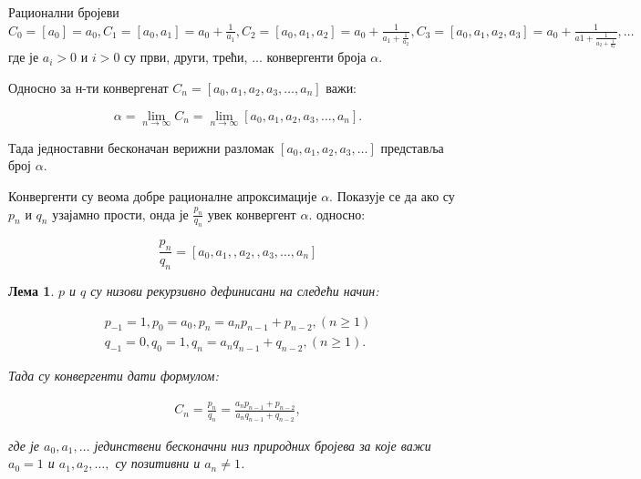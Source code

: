 \documentclass[a4paper]{article}
\newtheorem{lemma}{Лема}
\begin{document}
Рационални бројеви $ C_{0} = [a_{0}] = a_{0}, C_{1} = [a_{0}, a_{1}] = a_{0} + \frac{1}{a_{1}}, C_{2} = [a_{0}, a_{1}, a_{2}] = a_{0} + \frac{1}{a_{1} + \frac{1}{a_{2}}}, C_{3} = [a_{0}, a_{1}, a_{2}, a_{3}] = a_{0} + \frac{1}{a{1} + \frac{1}{a_{2} + \frac{1}{a_{3}}}}, \ldots $ где је $ a_{i} > 0 $ и $ i > 0 $ су први, други, трећи, ... конвергенти броја $ \alpha $. 

Односно за н-ти конвергенат $ C_{n} = [a_{0}, a_{1}, a_{2}, a_{3}, \ldots, a_{n}] $ важи:

\begin{displaymath}
	\alpha = \lim\limits_{n \rightarrow \infty} C_{n} = \lim\limits_{n \rightarrow \infty} [a_{0}, a_{1}, a_{2}, a_{3}, \ldots, a_{n}].
\end{displaymath}

Тада једноставни бесконачан верижни разломак $ [a_{0}, a_{1}, a_{2}, a_{3}, \ldots] $ представља број $ \alpha $.

Конвергенти су веома добре рационалне апроксимације $ \alpha $. Показује се да ако су $ p_{n} $ и $ q_{n} $ узајамно прости, онда је $ \frac{p_{n}}{q_{n}} $ увек конвергент $ \alpha $. односно:

	\begin{displaymath}
		\frac{p_{n}}{q_{n}} = [a_{0}, a_{1}, , a_{2}, , a_{3}, \dots, a_{n}]
	\end{displaymath}


\begin{lemma}
	\label{def:p_q_nizovi}
	$ p $ и $ q $ су низови рекурзивно дефинисани на следећи начин:
	
	\begin{eqnarray}
		p_{-1} = 1, p_{0} = a_{0}, p_{n} = a_{n}p_{n-1} + p_{n-2}, (n \geq 1 )\\
		q_{-1} = 0, q_{0} = 1, q_{n} = a_{n}q_{n-1} + q_{n-2}, (n \geq 1 ).
	\end{eqnarray}
	
	Тада су конвергенти дати формулом:
	
	\begin{eqnarray}
		C_{n} = \frac{p_{n}}{q_{n}} = \frac{a_{n}p_{n-1} + p_{n-2}}{a_{n}q_{n-1} + q_{n-2}},
	\end{eqnarray}
	
	где је $ a_{0}, a_{1}, \dots $ јединствени бесконачни низ природних бројева за које важи $ a_{0} = 1 $ и $ a_{1}, a_{2}, \dots ,  $ су позитивни и $ a_{n} \ne 1 $.
\end{lemma}
\end{document}
